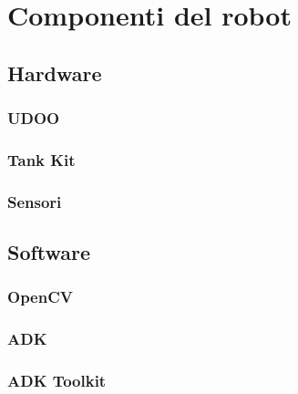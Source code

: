 \chapter{Componenti del robot}
\section{Hardware}
\subsection{UDOO}
\subsection {Tank Kit}
\subsection {Sensori}

\section{Software}
\subsection {OpenCV}
\subsection {ADK}
\subsection {ADK Toolkit}
